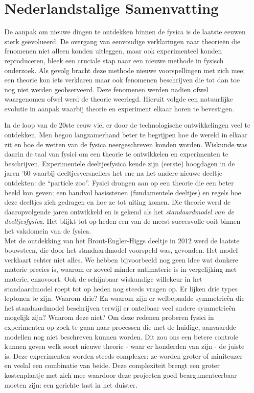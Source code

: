 \chapter*{Nederlandstalige Samenvatting}\label{nederlands}
%

De aanpak om nieuwe dingen te ontdekken binnen de fysica is de laatste eeuwen sterk ge\"evolueerd. De overgang van eenvoudige verklaringen naar theorie\"en die fenomenen niet alleen konden uitleggen, maar ook experimenteel konden reproduceren, bleek een cruciale stap naar een nieuwe methode in fysisch onderzoek. Als gevolg bracht deze methode nieuwe voorspellingen met zich mee; een theorie kon iets verklaren maar ook fenomenen beschrijven die tot dan toe nog niet werden geobserveerd. Deze fenomenen werden nadien ofwel waargenomen ofwel werd de theorie weerlegd. Hieruit volgde een natuurlijke evolutie in aanpak waarbij theorie en experiment elkaar horen te bevestigen.

In de loop van de 20ste eeuw viel er door de technologische ontwikkelingen veel te ontdekken. Men begon langzamerhand beter te begrijpen hoe de wereld in elkaar zit en hoe de wetten van de fysica neergeschreven konden worden. Wiskunde was daarin de taal van fysici om een theorie te ontwikkelen en experimenten te beschrijven. Experimentele deeltjesfysica kende zijn (eerste) hoogdagen in de jaren '60 waarbij deeltjesversnellers het ene na het andere nieuwe deeltje ontdekten: de ``particle zoo''. Fysici drongen aan op een theorie die een beter beeld kon geven; een handvol basisstenen (fundamentele deeltjes) en regels hoe deze deeltjes zich gedragen en hoe ze tot uiting komen. Die theorie werd de daaropvolgende jaren ontwikkeld en is gekend als het \textit{standaardmodel van de deeltjesfysica}. Het blijkt tot op heden een van de meest succesvolle ooit binnen het vakdomein van de fysica.\\

\noindent Met de ontdekking van het Brout-Engler-Higgs deeltje in 2012 werd de laatste bouwsteen, die door het standaardmodel voorspeld was, gevonden. Het model verklaart echter niet alles. We hebben bijvoorbeeld nog geen idee wat donkere materie precies is, waarom er zoveel minder antimaterie is in vergelijking met materie, enzovoort. Ook de schijnbaar wiskundige willekeur in het standaardmodel roept tot op heden nog steeds vragen op. Er lijken drie types leptonen te zijn. Waarom drie? En waarom zijn er welbepaalde symmetrie\"en die het standaardmodel beschrijven terwijl er ontelbaar veel andere symmetrie\"en mogelijk zijn? Waarom deze niet? Om deze redenen proberen fysici in experimenten op zoek te gaan naar processen die met de huidige, aanvaardde modellen nog niet beschreven kunnen worden. Dit zou ons een betere controle kunnen geven welk soort nieuwe theorie - waar er honderden van zijn - de juiste is. Deze experimenten worden steeds complexer: ze worden groter of miniteuzer en veelal een combinatie van beide. Deze complexiteit brengt een groter kostenplaatje met zich mee waardoor deze projecten goed beargumenteerbaar moeten zijn: een gerichte tast in het duister.


